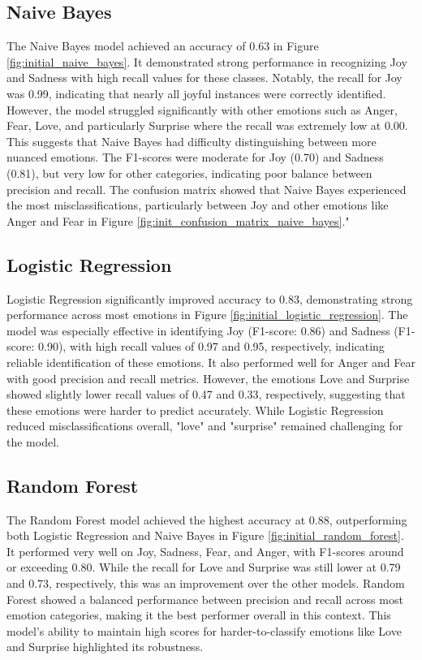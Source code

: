 \clearpage

\subsection{Naive Bayes}
The Naive Bayes model achieved an accuracy of 0.63 in Figure \ref{fig:initial_naive_bayes}. It demonstrated strong performance in recognizing Joy and Sadness with high recall values for these classes. Notably, the recall for Joy was 0.99, indicating that nearly all joyful instances were correctly identified. However, the model struggled significantly with other emotions such as Anger, Fear, Love, and particularly Surprise where the recall was extremely low at 0.00. This suggests that Naive Bayes had difficulty distinguishing between more nuanced emotions. The F1-scores were moderate for Joy (0.70) and Sadness (0.81), but very low for other categories, indicating poor balance between precision and recall. The confusion matrix showed that Naive Bayes experienced the most misclassifications, particularly between Joy and other emotions like Anger and Fear in Figure \ref{fig:init_confusion_matrix_naive_bayes}."

\subsection{Logistic Regression}
Logistic Regression significantly improved accuracy to 0.83, demonstrating strong performance across most emotions in Figure \ref{fig:initial_logistic_regression}. The model was especially effective in identifying Joy (F1-score: 0.86) and Sadness (F1-score: 0.90), with high recall values of 0.97 and 0.95, respectively, indicating reliable identification of these emotions. It also performed well for Anger and Fear with good precision and recall metrics. However, the emotions Love and Surprise showed slightly lower recall values of 0.47 and 0.33, respectively, suggesting that these emotions were harder to predict accurately. While Logistic Regression reduced misclassifications overall, "love" and "surprise" remained challenging for the model.

\subsection{Random Forest}
The Random Forest model achieved the highest accuracy at 0.88, outperforming both Logistic Regression and Naive Bayes in Figure \ref{fig:initial_random_forest}. It performed very well on Joy, Sadness, Fear, and Anger, with F1-scores around or exceeding 0.80. While the recall for Love and Surprise was still lower at 0.79 and 0.73, respectively, this was an improvement over the other models. Random Forest showed a balanced performance between precision and recall across most emotion categories, making it the best performer overall in this context. This model's ability to maintain high scores for harder-to-classify emotions like Love and Surprise highlighted its robustness.

